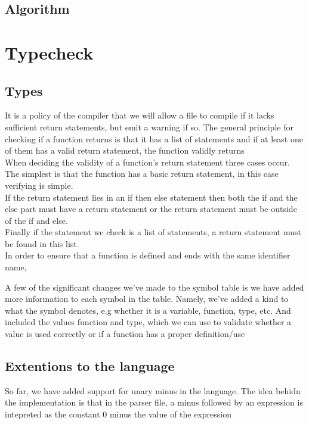 \documentclass{article}
\begin{document}
\subsection{Algorithm}

\section{Typecheck}

\subsection{Types}
It is a policy of the compiler that we will allow a file to compile if it lacks sufficient return statements, but emit a warning if so. The general principle for checking if a function returns is that it has a list of statements and if at least one of them has a valid return statement, the function validly returns\\


When deciding the validity of a function's return statement three cases occur. The simplest is that the function has a basic return statement, in this case verifying is simple. \\
If the return statement lies in an if then else statement then both the if and the else part must have a return statement or the return statement must be outside of the if and else.\\ 
Finally if the statement we check is a list of statements, a return statement must be found in this list.\\
In order to ensure that a function is defined and ends with the same identifier name, 

A few of the significant changes we've made to the symbol table is we have added more information to each symbol in the table. Namely, we've added a kind to what the symbol denotes, e.g whether it is a variable, function, type, etc. And included the values function and type, which we can use to validate whether a value is used correctly or if a function has a proper definition/use

\subsection{Extentions to the language}
So far, we have added support for unary minus in the language. The idea behidn the implementation is that in the parser file, a minus followed by an expression is intepreted as the constant 0 minus the value of the expression
\end{document}
